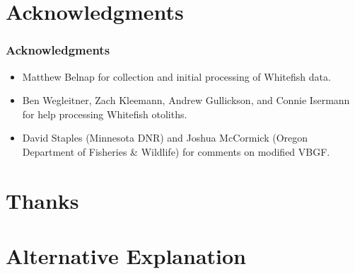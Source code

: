 \documentclass[xcolor=dvipsnames]{beamer}\usepackage[]{graphicx}\usepackage[]{color}
\begin{document}
\section*{Acknowledgments}
\begin{frame}[fragile, t]
\frametitle{Acknowledgments}
\begin{itemize}
  \item Matthew Belnap for collection and initial processing of Whitefish data.
  \bigskip
  \item Ben Wegleitner, Zach Kleemann, Andrew Gullickson, and Connie Isermann for help processing Whitefish otoliths.
  \bigskip
  \item David Staples (Minnesota DNR) and Joshua McCormick (Oregon Department of Fisheries \& Wildlife) for comments on modified VBGF.
\end{itemize}
\end{frame}


\section*{Thanks}
\begin{frame}[plain]
\end{frame}




\section*{Alternative Explanation}
\end{document}
